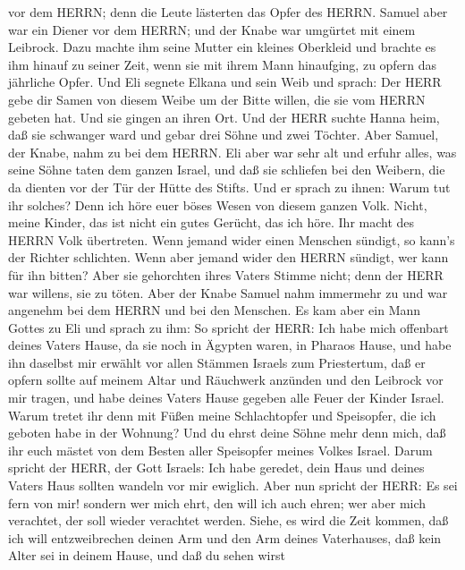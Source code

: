 vor dem HERRN; denn die Leute lästerten das Opfer des HERRN.
 Samuel aber war ein Diener vor dem HERRN; und der Knabe
war umgürtet mit einem Leibrock.  Dazu machte ihm seine
Mutter ein kleines Oberkleid und brachte es ihm hinauf zu seiner Zeit,
wenn sie mit ihrem Mann hinaufging, zu opfern das jährliche Opfer.
 Und Eli segnete Elkana und sein Weib und sprach: Der HERR
gebe dir Samen von diesem Weibe um der Bitte willen, die sie vom HERRN
gebeten hat. Und sie gingen an ihren Ort.  Und der HERR
suchte Hanna heim, daß sie schwanger ward und gebar drei Söhne und zwei
Töchter. Aber Samuel, der Knabe, nahm zu bei dem HERRN. 
Eli aber war sehr alt und erfuhr alles, was seine Söhne taten dem ganzen
Israel, und daß sie schliefen bei den Weibern, die da dienten vor der
Tür der Hütte des Stifts.  Und er sprach zu ihnen: Warum
tut ihr solches? Denn ich höre euer böses Wesen von diesem ganzen Volk.
 Nicht, meine Kinder, das ist nicht ein gutes Gerücht, das
ich höre. Ihr macht des HERRN Volk übertreten.  Wenn jemand
wider einen Menschen sündigt, so kann's der Richter schlichten. Wenn
aber jemand wider den HERRN sündigt, wer kann für ihn bitten? Aber sie
gehorchten ihres Vaters Stimme nicht; denn der HERR war willens, sie zu
töten.  Aber der Knabe Samuel nahm immermehr zu und war
angenehm bei dem HERRN und bei den Menschen.  Es kam aber
ein Mann Gottes zu Eli und sprach zu ihm: So spricht der HERR: Ich habe
mich offenbart deines Vaters Hause, da sie noch in Ägypten waren, in
Pharaos Hause,  und habe ihn daselbst mir erwählt vor allen
Stämmen Israels zum Priestertum, daß er opfern sollte auf meinem Altar
und Räuchwerk anzünden und den Leibrock vor mir tragen, und habe deines
Vaters Hause gegeben alle Feuer der Kinder Israel.  Warum
tretet ihr denn mit Füßen meine Schlachtopfer und Speisopfer, die ich
geboten habe in der Wohnung? Und du ehrst deine Söhne mehr denn mich,
daß ihr euch mästet von dem Besten aller Speisopfer meines Volkes
Israel.  Darum spricht der HERR, der Gott Israels: Ich habe
geredet, dein Haus und deines Vaters Haus sollten wandeln vor mir
ewiglich. Aber nun spricht der HERR: Es sei fern von mir! sondern wer
mich ehrt, den will ich auch ehren; wer aber mich verachtet, der soll
wieder verachtet werden.  Siehe, es wird die Zeit kommen,
daß ich will entzweibrechen deinen Arm und den Arm deines Vaterhauses,
daß kein Alter sei in deinem Hause,  und daß du sehen wirst
